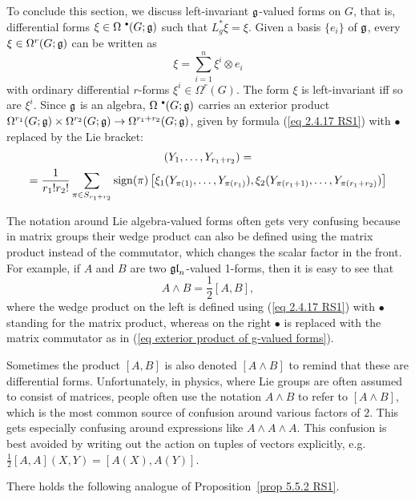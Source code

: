 To conclude this section, we discuss left-invariant $\mathfrak{g}$-valued forms on $G$, that is, differential forms $\xi\in\Omega^{\smbullet }(G;\frakg)$ such that $L^\ast_g\xi=\xi$. Given a basis $\{e_i\}$ of $\mathfrak{g}$, every $\xi\in\Omega^r(G;\mathfrak{g})$ can be written as
\[\xi=\sum_{i=1}^n\xi^i\otimes e_i\]
with ordinary differential $r$-forms $\xi^i\in\Omega^r(G)$. The form $\xi$ is left-invariant iff so are $\xi^i$. Since $\mathfrak{g}$ is an algebra, $\Omega^{\smbullet }(G;\frakg)$ carries an exterior product $\Omega^{r_1}(G;\mathfrak{g})\times \Omega^{r_2}(G;\mathfrak{g})\to \Omega^{r_1+r_2}(G;\mathfrak{g})$, given by formula (\ref{eq 2.4.17 RS1}) with $\bullet$ replaced by the Lie bracket:
\begin{multline}
    [\xi_1, \xi_2](Y_1,\ldots,Y_{r_1+r_2})=\\
    =\frac{1}{r_1!r_2!}\sum_{\pi\in S_{r_1+r_2}} \sign(\pi)\left[\xi_1(Y_{\pi(1)},\ldots,Y_{\pi(r_1)}), 
    \xi_2(Y_{\pi(r_1+1)},\ldots,Y_{\pi(r_1+r_2)})\right]\label{eq exterior product of g-valued forms}
\end{multline}


\begin{rem}\label{rem lie alg val forms}
    The notation around Lie algebra-valued forms often gets very confusing because in matrix groups their wedge product can also be defined using the matrix product instead of the commutator, which changes the scalar factor in the front. For example, if $A$ and $B$ are two $\mathfrak{gl}_n$-valued 1-forms, then it is easy to see that
    \[A\wedge B=\frac12 [A,B],\]
    where the wedge product on the left is defined using (\ref{eq 2.4.17 RS1}) with $\bullet$ standing for the matrix product, whereas on the right $\bullet$ is replaced with the matrix commutator as in (\ref{eq exterior product of g-valued forms}).

    Sometimes the product $[A,B]$ is also denoted $[A\wedge B]$ to remind that these are differential forms. Unfortunately, in physics, where Lie groups are often assumed to consist of matrices, people often use the notation $A\wedge B$ to refer to $[A\wedge B]$, which is the most common source of confusion around various factors of $2$. This gets especially confusing around expressions like $A\wedge A\wedge A$. This confusion is best avoided by writing out the action on tuples of vectors explicitly, e.g.\ $\frac12[A,A](X,Y)=[A(X),A(Y)]$.
\end{rem}


There holds the following analogue of Proposition~\ref{prop 5.5.2 RS1}.

